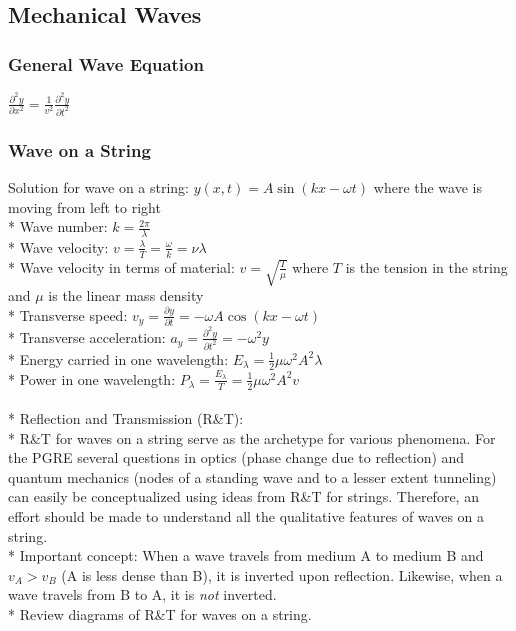 \subsection{Mechanical Waves}

\subsubsection{General Wave Equation}
\(\displaystyle \frac{\partial^2y}{\partial x^2}=\frac{1}{v^2}\frac{\partial^2y}{\partial t^2}\)

\subsubsection{Wave on a String}
Solution for wave on a string: \(y(x,t)=A\sin(kx-\omega t)\) where the wave is moving from left to right\\*
Wave number: \(k=\frac{2\pi}{\lambda}\)\\*
Wave velocity: \(v=\frac{\lambda}{T}=\frac{\omega}{k}=\nu\lambda\)\\*
Wave velocity in terms of material: \(v=\sqrt{\frac{T}{\mu}}\) where \(T\) is the tension in the string and \(\mu\) is the linear mass density\\*
Transverse speed: \(v_y=\frac{\partial y}{\partial t}=-\omega A\cos(kx-\omega t)\)\\*
Transverse acceleration: \(a_y=\frac{\partial^2 y}{\partial t^2}=-\omega^2 y\)\\*
Energy carried in one wavelength: \(E_{\lambda}=\frac{1}{2}\mu\omega^2A^2\lambda\)\\*
Power in one wavelength: \(P_{\lambda}=\frac{E_{\lambda}}{T}=\frac{1}{2}\mu\omega^2A^2v\)\\\\*
Reflection and Transmission (R\&T):\\*
R\&T for waves on a string serve as the archetype for various phenomena.
For the PGRE several questions in optics (phase change due to reflection) and quantum mechanics (nodes of a standing wave and to a lesser extent tunneling) can easily be conceptualized using ideas from R\&T for strings.
Therefore, an effort should be made to understand all the qualitative features of waves on a string.\\*
Important concept: When a wave travels from medium A to medium B and \(v_A>v_B\) (A is less dense than B), it is inverted upon reflection.
Likewise, when a wave travels from B to A, it is \emph{not} inverted.\\*
Review diagrams of R\&T for waves on a string.

